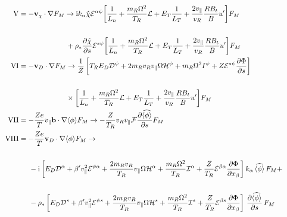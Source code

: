 \begin{align}
\\
\label{eq:V}{\rm V} &= - {\bf v}_\chi \cdot \nabla F_M \rightarrow  
{\rm i}k_\alpha \hat \chi 
 {\cal E}^{\alpha \psi} \biggl [ {1 \over L_n} + {m_R \Omega ^2 \over T_R}{\cal L} + E_T {1 \over L_T} + {2 v_{\parallel} \over v_R} {R B_t \over B} u^\prime \biggr ] F_{M} \cr 
\nonumber\\
& \hspace{2.3cm} +\rho_* \frac{\partial \hat\chi}{\partial s}{\cal E}^{s\psi} \biggl [ {1 \over L_n} + {m_R \Omega ^2 \over T_R}{\cal L} + E_T {1 \over L_T} + {2 v_{\parallel} \over v_R}{ R B_t \over B} u^\prime \biggr ] F_{M}
\\
\label{eq:VI}{\rm VI} &= - {\bf v}_D \cdot \nabla F_M \rightarrow  {1 \over Z} \left[ T_R E_D {\cal D}^\psi + 2 m_R v_R v_{\parallel}
\Omega{\cal H}^\psi + m_R \Omega^2 I^\psi + Z{\cal E}^{s \psi} \frac{\partial \Phi}{\partial s}\right] \cr 
\nonumber\\
& \hspace{2.3cm} \times \biggl [ {1 \over L_n} + {m_R \Omega ^2 \over T_R}{\cal L} + E_T {1 \over L_T} + {2 v_{\parallel} \over v_R} {R B_t \over B} u^\prime \biggr ] F_{M}
\\
\label{eq:VII}{\rm VII} &= - {Z e \over T} v_\parallel {\bf b} \cdot \nabla \langle \phi \rangle F_M \rightarrow - {Z \over T_R} v_R v_{\parallel} 
{\cal F} \frac{\partial \widehat{\langle \phi \rangle}}{\partial s} F_{M}
\\
\label{eq:VIII}{\rm VIII} &= - {Z e \over T}{\bf v}_D \cdot \nabla \langle \phi \rangle F_M  \rightarrow \cr 
\nonumber\\
& \hspace{0.5cm} - {\rm i} \left[ E_D {\cal D}^\alpha + \beta^\prime v_{\parallel}^2 {\cal E}^{\psi \alpha} + 
{2 m_R v_R \over T_R}v_{\parallel}\Omega{\cal H}^\alpha + {m_R\Omega^2 \over T_R}{\cal I}^\alpha 
+ {Z \over T_R} {\cal E}^{\beta \alpha} \frac{\partial \Phi}{\partial x_\beta} \right] 
k_\alpha \, \widehat{\langle \phi \rangle} \, F_{M}+ \cr 
\nonumber\\
& \hspace{0.5cm} - \rho_*\left[ E_D {\cal D}^s + \beta^\prime v_{\parallel}^2 {\cal E}^{\psi s} + 
{2 m_R v_R \over T_R}v_{\parallel}\Omega{\cal H}^s + {m_R\Omega^2 \over T_R}{\cal I}^s 
+ {Z \over T_R} {\cal E}^{\beta s} \frac{\partial \Phi}{\partial x_\beta} \right] 
\, \frac{\partial \widehat{\langle \phi \rangle}}{\partial s} \, F_{M} \cr 
 & &\qquad 
\end{align}
